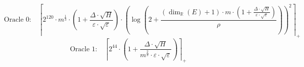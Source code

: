 \[\text{Oracle 0:}\quad \left\lceil 2^{120} \cdot m^{\frac{1}{3}} \cdot \left(1 + \frac{\Delta \cdot \sqrt{H}}{\varepsilon \cdot \sqrt{\varepsilon}}\right) \cdot \left(\log\left(2 + \frac{\left(\dim_{\mathbb{R}}\left(E\right) + 1\right) \cdot m \cdot \left(1 + \frac{\Delta \cdot \sqrt{H}}{\varepsilon \cdot \sqrt{\varepsilon}}\right)}{\rho}\right)\right)^{2} \right\rceil_{+}\]
\[\text{Oracle 1:}\quad \left\lceil 2^{44} \cdot \left(1 + \frac{\Delta \cdot \sqrt{H}}{m^{\frac{2}{3}} \cdot \varepsilon \cdot \sqrt{\varepsilon}}\right) \right\rceil_{+}\]
